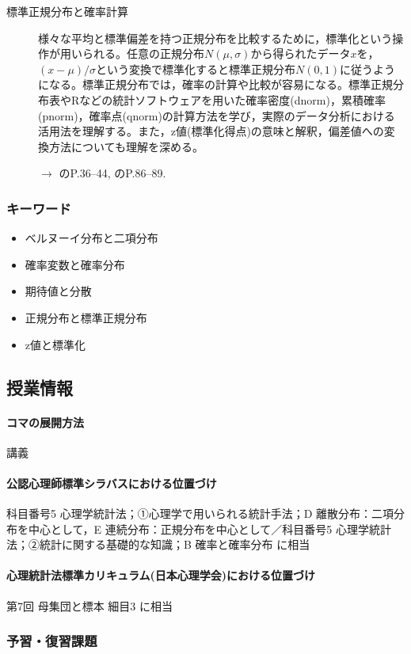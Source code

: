 \begin{description}
	\item[標準正規分布と確率計算] 様々な平均と標準偏差を持つ正規分布を比較するために，標準化という操作が用いられる。任意の正規分布$N(\mu,\sigma)$から得られたデータ$x$を，$(x-\mu)/\sigma$という変換で標準化すると標準正規分布$N(0,1)$に従うようになる。標準正規分布では，確率の計算や比較が容易になる。標準正規分布表やRなどの統計ソフトウェアを用いた確率密度(dnorm)，累積確率(pnorm)，確率点(qnorm)の計算方法を学び，実際のデータ分析における活用法を理解する。また，z値(標準化得点)の意味と解釈，偏差値への変換方法についても理解を深める。
	      \begin{flushright}
		      $\to$ \textcite{Kawabata201408}のP.36--44, \textcite{Yamada2004}のP.86--89.
	      \end{flushright}
\end{description}

\subsubsection{キーワード}
\begin{itemize}
	\item ベルヌーイ分布と二項分布
	\item 確率変数と確率分布
	\item 期待値と分散
	\item 正規分布と標準正規分布
	\item z値と標準化
\end{itemize}

\subsection{授業情報}
\paragraph{コマの展開方法}
講義
\paragraph{公認心理師標準シラバスにおける位置づけ}
科目番号5 心理学統計法；①心理学で用いられる統計手法；D 離散分布：二項分布を中心として，E 連続分布：正規分布を中心として／科目番号5 心理学統計法；②統計に関する基礎的な知識；B 確率と確率分布 に相当
\paragraph{心理統計法標準カリキュラム(日本心理学会)における位置づけ}
第7回 母集団と標本 細目3 に相当
\subsubsection{予習・復習課題}
